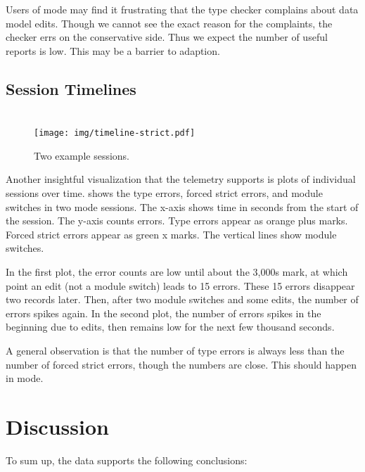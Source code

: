 \documentclass[english,submission,cleveref]{programming}
\begin{document}
Users of \mstrict{} mode may find it frustrating that the type checker complains
about data model edits.
Though we cannot see the exact reason for the complaints, the checker errs on
the conservative side.
Thus we expect the number of useful reports is low.
This may be a barrier to adaption.


\subsection{Session Timelines}

\begin{figure}[t]\centering

  \medskip{}
  \mstrict{}\\
  \texttt{[image: img/timeline-strict.pdf]}

  \caption{Two example sessions.}
  \label{f:indy-session}
\end{figure}

Another insightful visualization that the telemetry supports is plots of individual sessions
over time.
 shows the type errors, forced strict errors, and module switches
in two \mstrict{} mode sessions.
The x-axis shows time in seconds from the start of the session.
The y-axis counts errors.
Type errors appear as orange plus marks.
Forced strict errors appear as green x marks.
The vertical lines show module switches.

In the first plot, the error counts are low until about the 3,000s mark,
at which point an edit (not a module switch) leads to 15 errors.
These 15 errors disappear two records later.
Then, after two module switches and some edits, the number of errors spikes again.
In the second plot, the number of errors spikes in the beginning due to edits,
then remains low for the next few thousand seconds.

A general observation is that the number of type errors is always less than the number of forced strict
errors, though the numbers are close.
This should happen in \mstrict{} mode.


\section{Discussion}
\label{s:discussion}

To sum up, the data supports the following conclusions:
\end{document}
